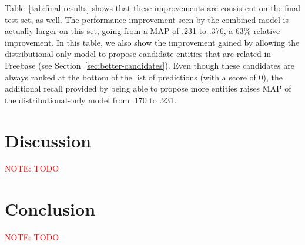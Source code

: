 \documentclass[11pt]{article}
\newcommand{\secref}[1]{Section~\ref{sec:#1}}
\newcommand{\tabref}[1]{Table~\ref{tab:#1}}
\newcommand{\mattnote}[1]{\textcolor{red}{NOTE: #1}}
\begin{document}
\tabref{final-results} shows that these improvements are consistent on the
final test set, as well.  The performance improvement seen by the combined
model is actually larger on this set, going from a MAP of .231 to .376, a 63\%
relative improvement.  In this table, we also show the improvement gained by
allowing the distributional-only model to propose candidate entities that are
related in Freebase (see \secref{better-candidates}).  Even though these
candidates are always ranked at the bottom of the list of predictions (with a
score of 0), the additional recall provided by being able to propose more
entities raises MAP of the distributional-only model from .170 to .231.

\section{Discussion}
\label{sec:discussion}

\mattnote{TODO}

\section{Conclusion}
\label{sec:conclusion}

\mattnote{TODO}




\end{document}
